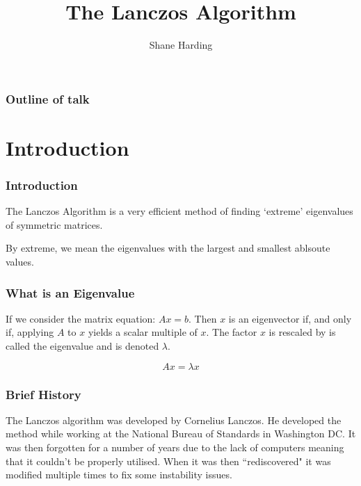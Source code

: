 \documentclass[pdf]{beamer}
\title{The Lanczos Algorithm}
\author{Shane Harding}
\begin{document}
\begin{frame}
\titlepage
\end{frame}


\begin{frame}
\frametitle{Outline of talk}
\tableofcontents[]

\end{frame}

\section{Introduction}

\begin{frame}
\tableofcontents[currentsection]
\end{frame}



\begin{frame}
\frametitle{Introduction}
\centering
The Lanczos Algorithm is a very efficient method of finding `extreme' eigenvalues of symmetric matrices.

By extreme, we mean the eigenvalues with the largest and smallest ablsoute values.

\end{frame}



\begin{frame}
\frametitle{What is an Eigenvalue}

If we consider the matrix equation: $A x = b$. Then $x$ is an eigenvector if, and only if, applying $A$ to $x$ yields a scalar multiple of $x$. The factor $x$ is rescaled by is called the eigenvalue and is denoted $\lambda$.

\[ A x = \lambda x \]

\end{frame}



\begin{frame}
\centering
\frametitle{Brief History}

The Lanczos algorithm was developed by Cornelius Lanczos. He developed the method while working at the National Bureau of Standards in Washington DC. It was then forgotten for a number of years due to the lack of computers meaning that it couldn't be properly utilised. When it was then ``rediscovered" it was modified multiple times to fix some instability issues.
\end{frame}
\end{document}
